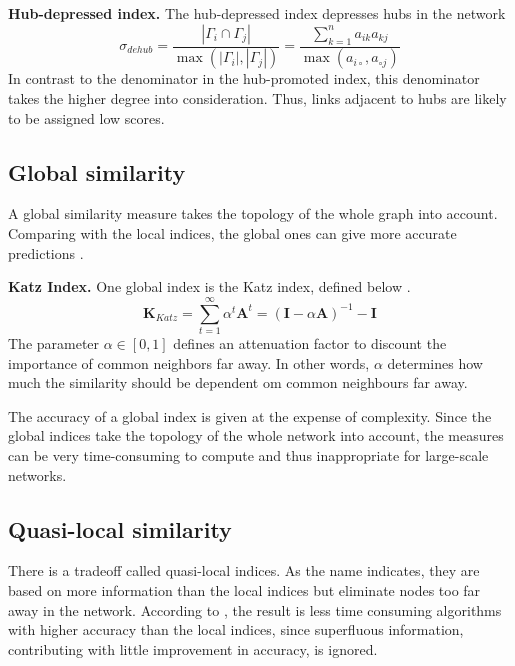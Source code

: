\textbf{Hub-depressed index.} The hub-depressed index depresses hubs in the network \citep{fouss2016algorithms}
\begin{equation}
    \label{dehub}
    \sigma_{dehub} = \frac{|\Gamma_i \cap \Gamma_j|}{\max(|\Gamma_i|,|\Gamma_j|)} = \frac{\sum_{k=1}^n a_{ik}a_{kj}}{\max(a_{i \circ },a_{\circ j})}
\end{equation}
In contrast to the denominator in the hub-promoted index, this denominator takes the higher degree into consideration. Thus, links adjacent to hubs are likely to be assigned low scores. 

\begin{comment}
\textbf{Adamic index.} 
\begin{equation}
    \label{adamic}
    \sigma_{Adamic} = \frac{|\Gamma_i \cap \Gamma_j|}{\log(|\Gamma_i|,|\Gamma_j|)} = \frac{\sum_{k=1}^n a_{ik}a_{kj}}{\max(a_{i \circ },a_{\circ j})}
\end{equation}
\end{comment}

\subsection{Global similarity}
A global similarity measure takes the topology of the whole graph into account. Comparing with the local indices, the global ones can give more accurate predictions \citep{lu2011}.

\textbf{Katz Index.} One global index is the Katz index, defined below \citep{fouss2016algorithms}.
\begin{equation}
    \textbf{K}_{Katz}=\sum_{t=1}^{\infty} \alpha^t \textbf{A}^t = (\textbf{I}-\alpha \textbf{A})^{-1}-\textbf{I}
\end{equation}
The parameter $\alpha \in [0,1]$ defines an attenuation factor to discount the importance of common neighbors far away. In other words, $\alpha$ determines how much the similarity should be dependent om common neighbours far away.

The accuracy of a global index is given at the expense of complexity. Since the global indices take the topology of the whole network into account, the measures can be very time-consuming to compute and thus inappropriate for large-scale networks. 

\subsection{Quasi-local similarity}
There is a tradeoff called quasi-local indices. As the name indicates, they are based on more information than the local indices but eliminate nodes too far away in the network. According to \citet{lu2011}, the result is less time consuming algorithms with higher accuracy than the local indices, since superfluous information, contributing with little improvement in accuracy, is ignored.

